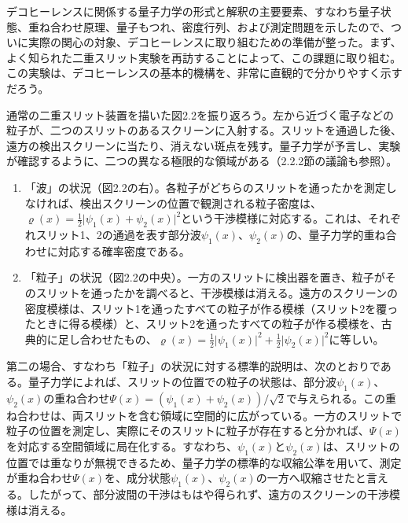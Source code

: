 

デコヒーレンスに関係する量子力学の形式と解釈の主要要素、すなわち量子状態、重ね合わせ原理、量子もつれ、密度行列、および測定問題を示したので、ついに実際の関心の対象、デコヒーレンスに取り組むための準備が整った。まず、よく知られた二重スリット実験を再訪することによって、この課題に取り組む。この実験は、デコヒーレンスの基本的機構を、非常に直観的で分かりやすく示すだろう。

通常の二重スリット装置を描いた図2.2を振り返ろう。左から近づく電子などの粒子が、二つのスリットのあるスクリーンに入射する。スリットを通過した後、遠方の検出スクリーンに当たり、消えない斑点を残す。量子力学が予言し、実験が確認するように、二つの異なる極限的な領域がある（2.2.2節の議論も参照）。
\begin{enumerate}
\item 「波」の状況（図2.2の右）。各粒子がどちらのスリットを通ったかを測定しなければ、検出スクリーンの位置で観測される粒子密度は、$\varrho(x)=\frac12\lvert\psi_1(x)+\psi_2(x)\rvert^2$という干渉模様に対応する。これは、それぞれスリット1、2の通過を表す部分波$\psi_1(x)$、$\psi_2(x)$の、量子力学的重ね合わせに対応する確率密度である。
\item 「粒子」の状況（図2.2の中央）。一方のスリットに検出器を置き、粒子がそのスリットを通ったかを調べると、干渉模様は消える。遠方のスクリーンの密度模様は、スリット1を通ったすべての粒子が作る模様（スリット2を覆ったときに得る模様）と、スリット2を通ったすべての粒子が作る模様を、古典的に足し合わせたもの、$\varrho(x)=\frac12\lvert\psi_1(x)\rvert^2+\frac12\lvert\psi_2(x)\rvert^2$に等しい。
\end{enumerate}

\hypertarget{srcpage:61}{}\label{srcpage:61}
第二の場合、すなわち「粒子」の状況に対する標準的説明は、次のとおりである。量子力学によれば、スリットの位置での粒子の状態は、部分波$\psi_1(x)$、$\psi_2(x)$の重ね合わせ$\Psi(x)=(\psi_1(x)+\psi_2(x))/\sqrt2$で与えられる。この重ね合わせは、両スリットを含む領域に空間的に広がっている。一方のスリットで粒子の位置を測定し、実際にそのスリットに粒子が存在すると分かれば、$\Psi(x)$を対応する空間領域に局在化する。すなわち、$\psi_1(x)$と$\psi_2(x)$は、スリットの位置では重なりが無視できるため、量子力学の標準的な収縮公準を用いて、測定が重ね合わせ$\Psi(x)$を、成分状態$\psi_1(x)$、$\psi_2(x)$の一方へ収縮させたと言える。したがって、部分波間の干渉はもはや得られず、遠方のスクリーンの干渉模様は消える。

